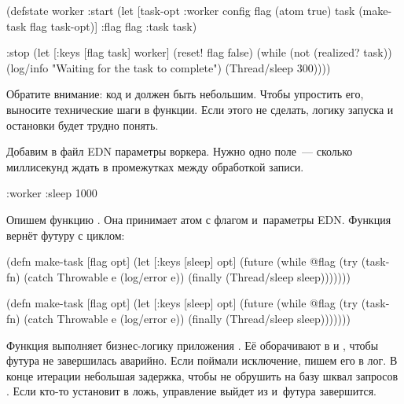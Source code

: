 \else

\begin{clojure}
(defstate worker
  :start
  (let [{task-opt :worker} config
        flag (atom true)
        task (make-task flag task-opt)]
    {:flag flag :task task})

  :stop
  (let [{:keys [flag task]} worker]
    (reset! flag false)
    (while (not (realized? task))
      (log/info "Waiting for the task to complete")
      (Thread/sleep 300))))
\end{clojure}

\fi

\fi

Обратите внимание: код  и  должен быть небольшим. Чтобы
упростить его, выносите технические шаги в функции. Если этого не сделать,
логику запуска и остановки будет трудно понять.

Добавим в файл EDN параметры воркера. Нужно одно поле~--- сколько миллисекунд
ждать в промежутках между обработкой записи.

\begin{clojure}
{:worker {:sleep 1000}}
\end{clojure}


\label{make-task}

Опишем функцию . Она принимает атом с флагом и~параметры
EDN. Функция вернёт футуру с циклом:

\pagebreaklarge

\ifnarrow

\begin{clojure/lines}
(defn make-task
  [flag opt]
  (let [{:keys [sleep]} opt]
    (future
      (while @flag
        (try
          (task-fn)
          (catch Throwable e
            (log/error e))
          (finally
            (Thread/sleep
              sleep)))))))
\end{clojure/lines}

\else

\begin{clojure/lines}
(defn make-task
  [flag opt]
  (let [{:keys [sleep]} opt]
    (future
      (while @flag
        (try
          (task-fn)
          (catch Throwable e
            (log/error e))
          (finally
            (Thread/sleep sleep)))))))
\end{clojure/lines}

\fi

Функция  выполняет бизнес-логику приложения . Её
оборачивают в  и , чтобы футура не завершилась
аварийно. Если поймали исключение, пишем его в лог. В конце итерации небольшая
задержка, чтобы не обрушить на базу шквал запросов . Если кто-то
установит  в ложь, управление выйдет из  и~футура
завершится.

